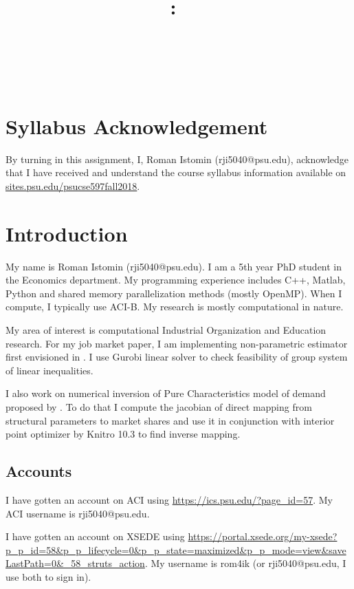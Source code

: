 \documentclass{article}
\title{\vspace{2in}\textmd{\textbf{\hmwkClass:\ \hmwkTitle}}\\\normalsize\vspace{0.1in}\small{\hmwkDueDate}\\\vspace{0.1in}\large{\textit{\hmwkClassInstructor\ \hmwkClassTime}}\vspace{3in}}
\date{}
\author{\textbf{\hmwkAuthorNameb} } %
\makeatletter
\newcommand{\hmwkAuthorNameb}{Roman Istomin (rji5040@psu.edu)}
\makeatother
\begin{document}
\begin{spacing}{1.1}
\maketitle

\newpage
\section{Syllabus Acknowledgement}

By turning in this assignment, I, \hmwkAuthorNameb, acknowledge that I have received and understand the course syllabus information available on \url{sites.psu.edu/psucse597fall2018}. 

\section{Introduction}

My name is \hmwkAuthorNameb.  I am a 5th year PhD student in the Economics department. My programming experience includes C++, Matlab, Python and shared memory parallelization methods (mostly OpenMP).  When I compute, I typically use ACI-B.  My research is mostly computational in nature. 

My area of interest is computational Industrial Organization and Education research. For my job market paper, I am implementing non-parametric estimator first envisioned in \cite{agarwal2018demand}. I use Gurobi linear solver to check feasibility of group system of linear inequalities. 

I also work on numerical inversion of Pure Characteristics model of demand proposed by \cite{berry2007pure}. To do that I compute the jacobian of direct mapping from structural parameters to market shares and use it in conjunction with interior point optimizer by Knitro 10.3 to find inverse mapping. 


\subsection{Accounts}

I have gotten an account on ACI using \url{https://ics.psu.edu/?page_id=57}.  My ACI username is rji5040@psu.edu.

I have gotten an account on XSEDE using \url{https://portal.xsede.org/my-xsede?p_p_id=58&p_p_lifecycle=0&p_p_state=maximized&p_p_mode=view&saveLastPath=0&_58_struts_action}.  My username is rom4ik (or rji5040@psu.edu, I use both to sign in).


\end{spacing}
\end{document}

